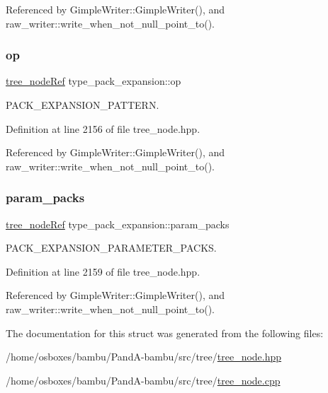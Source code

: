 Referenced by Gimple\+Writer\+::\+Gimple\+Writer(), and raw\+\_\+writer\+::write\+\_\+when\+\_\+not\+\_\+null\+\_\+point\+\_\+to().

\mbox{\label{structtype__pack__expansion_adbf4da3a02d6520fa846a05aee10e3ab}} 
\subsubsection{\texorpdfstring{op}{op}}
{\footnotesize\ttfamily \hyperlink{tree__node_8hpp_a6ee377554d1c4871ad66a337eaa67fd5}{tree\+\_\+node\+Ref} type\+\_\+pack\+\_\+expansion\+::op}



P\+A\+C\+K\+\_\+\+E\+X\+P\+A\+N\+S\+I\+O\+N\+\_\+\+P\+A\+T\+T\+E\+RN. 



Definition at line 2156 of file tree\+\_\+node.\+hpp.



Referenced by Gimple\+Writer\+::\+Gimple\+Writer(), and raw\+\_\+writer\+::write\+\_\+when\+\_\+not\+\_\+null\+\_\+point\+\_\+to().

\mbox{\label{structtype__pack__expansion_a91a6dbf9d3b70f695a636736ce03c98b}} 
\subsubsection{\texorpdfstring{param\+\_\+packs}{param\_packs}}
{\footnotesize\ttfamily \hyperlink{tree__node_8hpp_a6ee377554d1c4871ad66a337eaa67fd5}{tree\+\_\+node\+Ref} type\+\_\+pack\+\_\+expansion\+::param\+\_\+packs}



P\+A\+C\+K\+\_\+\+E\+X\+P\+A\+N\+S\+I\+O\+N\+\_\+\+P\+A\+R\+A\+M\+E\+T\+E\+R\+\_\+\+P\+A\+C\+KS. 



Definition at line 2159 of file tree\+\_\+node.\+hpp.



Referenced by Gimple\+Writer\+::\+Gimple\+Writer(), and raw\+\_\+writer\+::write\+\_\+when\+\_\+not\+\_\+null\+\_\+point\+\_\+to().



The documentation for this struct was generated from the following files\+:\begin{DoxyCompactItemize}
\item 
/home/osboxes/bambu/\+Pand\+A-\/bambu/src/tree/\hyperlink{tree__node_8hpp}{tree\+\_\+node.\+hpp}\item 
/home/osboxes/bambu/\+Pand\+A-\/bambu/src/tree/\hyperlink{tree__node_8cpp}{tree\+\_\+node.\+cpp}\end{DoxyCompactItemize}
